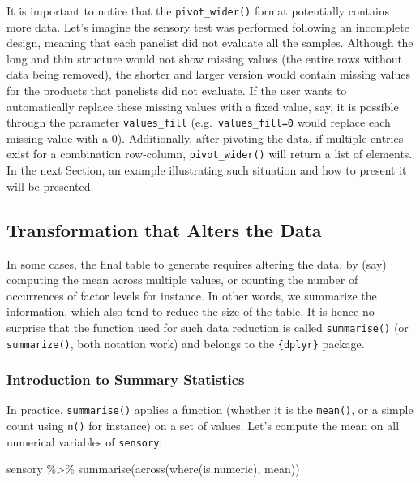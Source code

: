 \documentclass[
]{krantz}
\makeatletter
\newenvironment{Shaded}{\begin{snugshade}}{\end{snugshade}}
\newcommand{\FunctionTok}[1]{\textcolor[rgb]{0,0,0}{#1}}
\newcommand{\NormalTok}[1]{#1}
\newcommand{\SpecialCharTok}[1]{\textcolor[rgb]{0,0,0}{#1}}
\newenvironment{kframe}{%
\medskip{}
\setlength{\fboxsep}{.8em}
 \def\at@end@of@kframe{}%
 \ifinner\ifhmode%
  \def\at@end@of@kframe{\end{minipage}}%
  \begin{minipage}{\columnwidth}%
 \fi\fi%
 \def\FrameCommand##1{\hskip\@totalleftmargin \hskip-\fboxsep
 \colorbox{shadecolor}{##1}\hskip-\fboxsep
     \hskip-\linewidth \hskip-\@totalleftmargin \hskip\columnwidth}%
 \MakeFramed {\advance\hsize-\width
   \@totalleftmargin\z@ \linewidth\hsize
   \@setminipage}}%
 {\par\unskip\endMakeFramed%
 \at@end@of@kframe}
\renewenvironment{Shaded}{\begin{kframe}}{\end{kframe}}
\makeatother
\begin{document}
It is important to notice that the \texttt{pivot\_wider()} format potentially contains more data. Let's imagine the sensory test was performed following an incomplete design, meaning that each panelist did not evaluate all the samples. Although the long and thin structure would not show missing values (the entire rows without data being removed), the shorter and larger version would contain missing values for the products that panelists did not evaluate. If the user wants to automatically replace these missing values with a fixed value, say, it is possible through the parameter \texttt{values\_fill} (e.g.~\texttt{values\_fill=0} would replace each missing value with a 0). Additionally, after pivoting the data, if multiple entries exist for a combination row-column, \texttt{pivot\_wider()} will return a list of elements. In the next Section, an example illustrating such situation and how to present it will be presented.

\hypertarget{transformation-that-alters-the-data}{%
\subsection{Transformation that Alters the Data}\label{transformation-that-alters-the-data}}

In some cases, the final table to generate requires altering the data, by (say) computing the mean across multiple values, or counting the number of occurrences of factor levels for instance. In other words, we summarize the information, which also tend to reduce the size of the table. It is hence no surprise that the function used for such data reduction is called \texttt{summarise()} (or \texttt{summarize()}, both notation work) and belongs to the \texttt{\{dplyr\}} package.

\hypertarget{introduction-to-summary-statistics}{%
\subsubsection*{Introduction to Summary Statistics}\label{introduction-to-summary-statistics}}


In practice, \texttt{summarise()} applies a function (whether it is the \texttt{mean()}, or a simple count using \texttt{n()} for instance) on a set of values. Let's compute the mean on all numerical variables of \texttt{sensory}:

\begin{Shaded}
\begin{Highlighting}[]
\NormalTok{sensory }\SpecialCharTok{\%\textgreater{}\%}
  \FunctionTok{summarise}\NormalTok{(}\FunctionTok{across}\NormalTok{(}\FunctionTok{where}\NormalTok{(is.numeric), mean))}
\end{Highlighting}
\end{Shaded}
\end{document}
